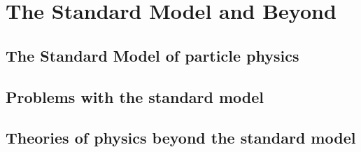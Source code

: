 \chapter{The Standard Model and Beyond}
\label{chap:theory}

\section{The Standard Model of particle physics}

\section{Problems with the standard model}

\section{Theories of physics beyond the standard model}
